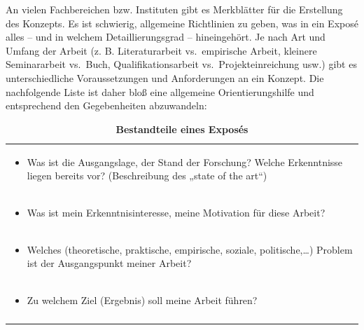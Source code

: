 \documentclass[]{book}
\providecommand{\tightlist}{%
  \setlength{\itemsep}{0pt}\setlength{\parskip}{0pt}}
\theoremstyle{definition}
\theoremstyle{definition}
\theoremstyle{definition}
\theoremstyle{remark}
\begin{document}
An vielen Fachbereichen bzw. Instituten gibt es Merkblätter für die
Erstellung des Konzepts. Es ist schwierig, allgemeine Richtlinien zu
geben, was in ein Exposé alles -- und in welchem Detaillierungsgrad --
hineingehört. Je nach Art und Umfang der Arbeit (z. B. Literaturarbeit
vs.~empirische Arbeit, kleinere Seminararbeit vs.~Buch,
Qualifikationsarbeit vs.~Projekteinreichung usw.) gibt es
unterschiedliche Voraussetzungen und Anforderungen an ein Konzept. Die
nachfolgende Liste ist daher bloß eine allgemeine Orientierungshilfe und
entsprechend den Gegebenheiten abzuwandeln:

\begin{longtable}[]{@{}l@{}}
\caption{\textbf{\label{tab:expose} Bestandteile eines
Exposés}}\tabularnewline
\toprule
\begin{minipage}[t]{0.97\columnwidth}\raggedright\strut
\begin{itemize}
\tightlist
\item
  Was ist die Ausgangslage, der Stand der Forschung? Welche Erkenntnisse
  liegen bereits vor? (Beschreibung des „state of the art``)
\end{itemize}\strut
\end{minipage}\tabularnewline
\begin{minipage}[t]{0.97\columnwidth}\raggedright\strut
\begin{itemize}
\tightlist
\item
  Was ist mein Erkenntnisinteresse, meine Motivation für diese Arbeit?
\end{itemize}\strut
\end{minipage}\tabularnewline
\begin{minipage}[t]{0.97\columnwidth}\raggedright\strut
\begin{itemize}
\tightlist
\item
  Welches (theoretische, praktische, empirische, soziale,
  politische,\ldots{}) Problem ist der Ausgangspunkt meiner Arbeit?
\end{itemize}\strut
\end{minipage}\tabularnewline
\begin{minipage}[t]{0.97\columnwidth}\raggedright\strut
\begin{itemize}
\tightlist
\item
  Zu welchem Ziel (Ergebnis) soll meine Arbeit führen?
\end{itemize}\strut
\end{minipage}\tabularnewline
\begin{minipage}[t]{0.97\columnwidth}\raggedright\strut

\end{minipage}
\end{longtable}
\end{document}
